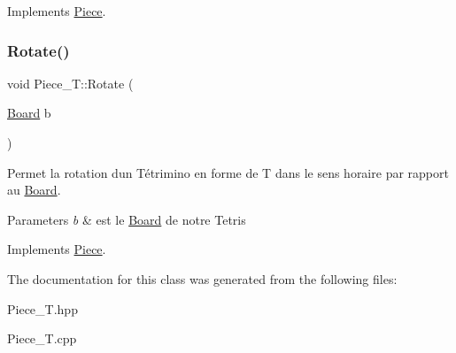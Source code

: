 Implements \hyperlink{classPiece_a56cdf7f4234fe848a3e203b693b7a862}{Piece}.

\mbox{\label{classPiece__T_affedcbe550aebd2a9e8ec169d1fe0a9f}} 
\subsubsection{\texorpdfstring{Rotate()}{Rotate()}}
{\footnotesize\ttfamily void Piece\+\_\+\+T\+::\+Rotate (\begin{DoxyParamCaption}\item[{\hyperlink{classBoard}{Board}}]{b }\end{DoxyParamCaption})\hspace{0.3cm}{\ttfamily [virtual]}}



Permet la rotation d\textquotesingle{}un Tétrimino en forme de T dans le sens horaire par rapport au \hyperlink{classBoard}{Board}. 


\begin{DoxyParams}{Parameters}
{\em b} & est le \hyperlink{classBoard}{Board} de notre Tetris \\
\hline
\end{DoxyParams}


Implements \hyperlink{classPiece_a078f3cc6281cb8f60af3ae2266c651ba}{Piece}.



The documentation for this class was generated from the following files\+:\begin{DoxyCompactItemize}
\item 
Piece\+\_\+\+T.\+hpp\item 
Piece\+\_\+\+T.\+cpp\end{DoxyCompactItemize}
